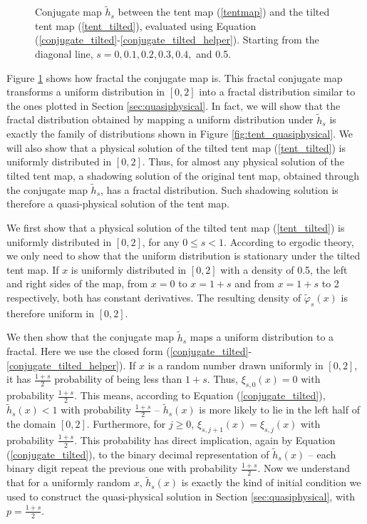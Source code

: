\begin{figure}[H]
    \caption{Conjugate map $\tilde{h}_s$ between the tent map (\ref{tentmap})
    and the tilted tent map (\ref{tent_tilted}), evaluated using
    Equation (\ref{conjugate_tilted}-\ref{conjugate_tilted_helper}).
    Starting from the diagonal line, $s=0, 0.1, 0.2, 0.3, 0.4,$ and 0.5.}
    \label{fig:tilted_tent_conjugate}
\end{figure}

Figure \ref{fig:tilted_tent_conjugate} shows how fractal the conjugate map is.
This fractal conjugate map transforms a uniform distribution in $[0,2]$ into
a fractal distribution similar to the ones plotted in Section \ref{sec:quasiphysical}.
In fact, we will show that the fractal distribution obtained by mapping a uniform
distribution under $\tilde{h}_s$ is exactly the family of distributions
shown in Figure \ref{fig:tent_quasiphysical}.  We will also show that
a physical solution of the tilted tent map (\ref{tent_tilted}) is uniformly
distributed in $[0,2]$.  Thus, for almost any physical solution of the
tilted tent map, a shadowing solution of the original tent map, obtained
through the conjugate map $\tilde{h}_s$, has a fractal distribution.
Such shadowing solution is therefore a quasi-physical solution of
the tent map.

We first show that a physical solution of the tilted tent map 
(\ref{tent_tilted}) is uniformly distributed in $[0,2]$, for
any $0\le s<1$.
According to ergodic theory, we only need to show that the uniform
distribution is stationary under the tilted tent map.
If $x$ is uniformly distributed in $[0,2]$ with a density of 0.5,
the left and right sides of the map, from $x=0$ to $x=1+s$ and
from $x=1+s$ to 2 respectively, both has constant derivatives.
The resulting density of $\tilde\varphi_s(x)$ is
therefore uniform in $[0,2]$.

We then show that the conjugate map $\tilde{h}_s$ maps a uniform
distribution to a fractal.  Here we use the closed form
(\ref{conjugate_tilted}-\ref{conjugate_tilted_helper}).
If $x$ is a random number drawn uniformly in $[0,2]$,
it has $\frac{1+s}2$ probability of being less than $1+s$.
Thus, $\xi_{s,0}(x)=0$ with probability $\frac{1+s}2$.
This means, according to Equation (\ref{conjugate_tilted}),
$\tilde{h}_s(x)<1$ with probability $\frac{1+s}2$ --
$\tilde{h}_s(x)$ is more likely to lie in the left half
of the domain $[0,2]$.
Furthermore, for $j\ge 0$, $\xi_{s,j+1}(x)=\xi_{s,j}(x)$
with probability $\frac{1+s}2$.  This probability has direct
implication, again by Equation (\ref{conjugate_tilted}),
to the binary decimal representation of $\tilde{h}_s(x)$ --
each binary digit repeat the previous one with probability
$\frac{1+s}2$.  Now we understand that for a uniformly random
$x$, $\tilde{h}_s(x)$ is exactly the kind of initial condition
we used to construct the quasi-physical solution
in Section \ref{sec:quasiphysical}, with $p=\frac{1+s}2$.

